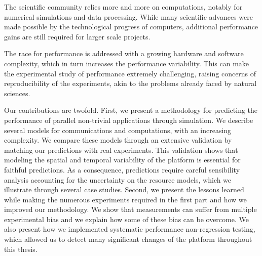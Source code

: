 The scientific community relies more and more on computations, notably for numerical simulations and data processing.
While many scientific advances were made possible by the technological progress of computers, additional performance
gains are still required for larger scale projects.

The race for performance is addressed with a growing hardware and software complexity, which in turn increases the
performance variability. This can make the experimental study of performance extremely challenging, raising concerns of
reproducibility of the experiments, akin to the problems already faced by natural sciences.

Our contributions are twofold. First, we present a methodology for predicting the performance of parallel non-trivial
applications through simulation. We describe several models for communications and computations, with an increasing
complexity. We compare these models through an extensive validation by matching our predictions with real experiments.
This validation shows that modeling the spatial and temporal variability of the platform is essential for faithful
predictions. As a consequence, predictions require careful sensibility analysis accounting for the uncertainty on the
resource models, which we illustrate through several case studies.  Second, we present the lessons learned while making
the numerous experiments required in the first part and how we improved our methodology. We show that measurements can
suffer from multiple experimental bias and we explain how some of these bias can be overcome. We also present how we
implemented systematic performance non-regression testing, which allowed us to detect many significant changes of the
platform throughout this thesis.
